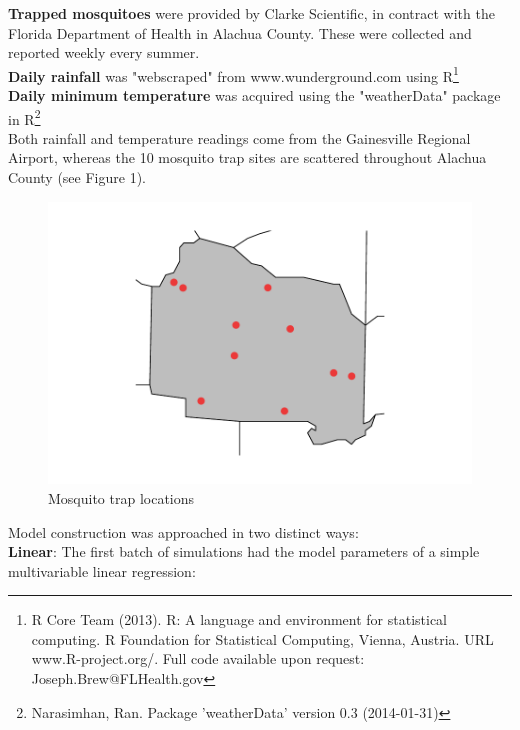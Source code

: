 \documentclass{article}
\begin{document}
\begin{multicols}{2}
\textbf{Trapped mosquitoes} were provided by Clarke Scientific, in contract with the Florida Department of Health in Alachua County. These were collected and reported weekly every summer. \\

\textbf{Daily rainfall} was "webscraped" from www.wunderground.com using R\footnote{R Core Team (2013). R: A language and environment for statistical computing. R Foundation for Statistical Computing, Vienna, Austria. URL www.R-project.org/. Full code available upon request: Joseph.Brew@FLHealth.gov} \\

\textbf{Daily minimum temperature} was acquired using the "weatherData" package in R\footnote{Narasimhan, Ran. Package 'weatherData' version 0.3 (2014-01-31)}\\

Both rainfall and temperature readings come from the Gainesville Regional Airport, whereas the 10 mosquito trap sites are scattered throughout Alachua County (see Figure 1).

\begin{figure}[H]
\begin{center}  
\includegraphics{mosquitoRainTempArticle-003}
\caption{Mosquito trap locations}
\end{center}
\end{figure}

Model construction was approached in two distinct ways:\\

\textbf{Linear}: The first batch of simulations had the model parameters of a simple multivariable linear regression: \\


\end{multicols}
\end{document}
